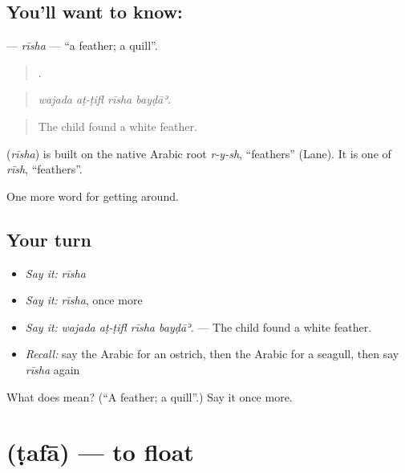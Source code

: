 \subsection*{You'll want to know: }
\textbf{} — \emph{rīsha} — \textquotedblleft{}a feather; a quill\textquotedblright{}.

\begin{quote}
   .
\end{quote}

\begin{quote}
\emph{wajada aṭ-ṭifl rīsha bayḍāʾ.}
\end{quote}

\begin{quote}
The child found a white feather.
\end{quote}

\begin{cousinweb}
\textbf{} (\emph{rīsha}) is built on the native Arabic root \emph{r-y-sh}, \textquotedblleft{}feathers\textquotedblright{} (Lane). It is one of \emph{rīsh}, \textquotedblleft{}feathers\textquotedblright{}.
\end{cousinweb}

\begin{grammarlens}[title={What you've built}]
One more word for getting around.
\end{grammarlens}

\subsection*{Your turn}
\begin{itemize}
\raggedright
  \item \emph{Say it:} \emph{rīsha}
  \item \emph{Say it:} \emph{rīsha}, once more
  \item \emph{Say it:} \emph{wajada aṭ-ṭifl rīsha bayḍāʾ.} — The child found a white feather.
  \item \emph{Recall:} say the Arabic for an ostrich, then the Arabic for a seagull, then say \emph{rīsha} again
\end{itemize}

\begin{tcolorbox}[breakable,colback=teal!4,colframe=teal!35!black,title={Before you move on}]
What does  mean? (\textquotedblleft{}A feather; a quill\textquotedblright{}.) Say it once more.
\end{tcolorbox}
\section[\texorpdfstring{\ar{طفا} (ṭafā)}{طفا (ṭafā)}]{ (ṭafā) — to float}

